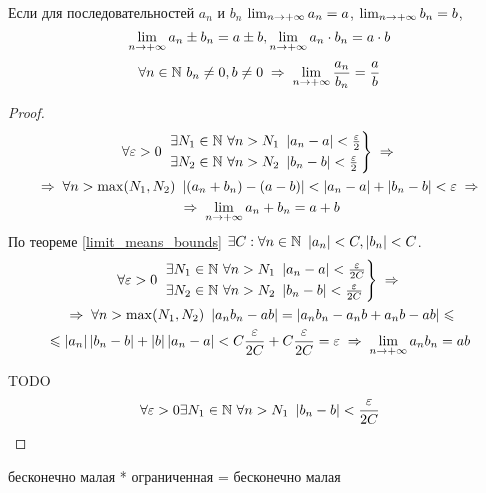 \begin{theorem}
    Если для последовательностей $a_n$ и $b_n$ $\lim_{n\to+\infty} a_n = a$, $\lim_{n\to+\infty} b_n = b$,
    \[ \lim_{n\to+\infty} a_n \pm b_n = a \pm b, \lim_{n\to+\infty} a_n \cdot b_n = a \cdot b \]
    \[ \forall n \in \N\ b_n \ne 0, b \ne 0 \thus \limpinf \frac{a_n}{b_n} = \frac{a}{b} \]
\end{theorem}
\begin{proof}
    \begin{multline*}
        \forall \varepsilon > 0\ 
        \begin{rcases}
            \exists N_1 \in \N\ \forall n > N_1\ \abs{a_n - a} < \frac{\varepsilon}{2} \\
            \exists N_2 \in \N\ \forall n > N_2\ \abs{b_n - b} < \frac{\varepsilon}{2}
        \end{rcases} \thus \\
        \thus \forall n > \max(N_1, N_2)\ \abs{(a_n + b_n) - (a - b)} <
        \abs{a_n - a} + \abs{b_n - b} < \varepsilon \thus \\
        \thus \limpinf{a_n + b_n} = a + b
    \end{multline*}
    По теореме \ref{limit_means_bounds} $\exists C : \forall n\in\mathbb{N}\ \left\lvert a_n \right\rvert < C, \left\lvert b_n \right\rvert < C$.
    \begin{multline*}
        \forall \varepsilon > 0\ 
        \begin{rcases}
            \exists N_1 \in \N\ \forall n > N_1\ \abs{a_n - a} < \frac{\varepsilon}{2C} \\
            \exists N_2 \in \N\ \forall n > N_2\ \abs{b_n - b} < \frac{\varepsilon}{2C}
        \end{rcases} \thus \\
        \thus \forall n > \max(N_1, N_2)\ \abs{a_n b_n - ab} = \abs{a_n b_n - a_n b + a_n b - ab} \le \\
        \le \abs{a_n} \abs{b_n - b} + \abs{b} \abs{a_n - a} <
        C \frac{\varepsilon}{2C} + C \frac{\varepsilon}{2C} = \varepsilon \thus
        \limpinf{a_n b_n} = a b
    \end{multline*}

    TODO %
    \begin{multline*}
        \forall \varepsilon > 0 \exists N_1 \in \mathbb{N}\ \forall n > N_1\ \left\lvert b_n - b \right\rvert < \frac{\varepsilon}{2C} \\
    \end{multline*}
     
\end{proof}

\begin{theorem}
    бесконечно малая * ограниченная = бесконечно малая
\end{theorem}
